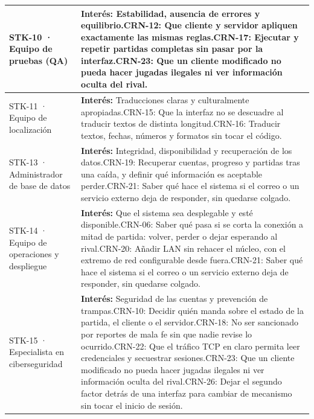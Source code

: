 \documentclass[11pt,letterpaper]{article}
\begin{document}
\begin{xltabular}{\linewidth}{|>{\raggedright\arraybackslash}p{4.2cm}|Y|}
  STK-10 · Equipo de pruebas (QA) & \textbf{Interés:} Estabilidad, ausencia de errores y equilibrio.\newline CRN-12: Que cliente y servidor apliquen exactamente las mismas reglas.\newline CRN-17: Ejecutar y repetir partidas completas sin pasar por la interfaz.\newline CRN-23: Que un cliente modificado no pueda hacer jugadas ilegales ni ver información oculta del rival.\\\hline
  STK-11 · Equipo de localización & \textbf{Interés:} Traducciones claras y culturalmente apropiadas.\newline CRN-15: Que la interfaz no se descuadre al traducir textos de distinta longitud.\newline CRN-16: Traducir textos, fechas, números y formatos sin tocar el código.\\\hline
  STK-13 · Administrador de base de datos & \textbf{Interés:} Integridad, disponibilidad y recuperación de los datos.\newline CRN-19: Recuperar cuentas, progreso y partidas tras una caída, y definir qué información es aceptable perder.\newline CRN-21: Saber qué hace el sistema si el correo o un servicio externo deja de responder, sin quedarse colgado.\\\hline
  STK-14 · Equipo de operaciones y despliegue & \textbf{Interés:} Que el sistema sea desplegable y esté disponible.\newline CRN-06: Saber qué pasa si se corta la conexión a mitad de partida: volver, perder o dejar esperando al rival.\newline CRN-20: Añadir LAN sin rehacer el núcleo, con el extremo de red configurable desde fuera.\newline CRN-21: Saber qué hace el sistema si el correo o un servicio externo deja de responder, sin quedarse colgado.\\\hline
  STK-15 · Especialista en ciberseguridad & \textbf{Interés:} Seguridad de las cuentas y prevención de trampas.\newline CRN-10: Decidir quién manda sobre el estado de la partida, el cliente o el servidor.\newline CRN-18: No ser sancionado por reportes de mala fe sin que nadie revise lo ocurrido.\newline CRN-22: Que el tráfico TCP en claro permita leer credenciales y secuestrar sesiones.\newline CRN-23: Que un cliente modificado no pueda hacer jugadas ilegales ni ver información oculta del rival.\newline CRN-26: Dejar el segundo factor detrás de una interfaz para cambiar de mecanismo sin tocar el inicio de sesión.\\\hline

\end{xltabular}
\end{document}
